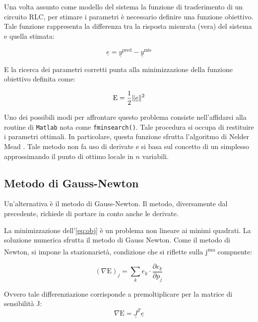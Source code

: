Una volta assunto come modello del sistema la funzione di trasferimento di un circuito RLC, per stimare i parametri è necessario definire una funzione obiettivo. Tale funzione rappresenta la differenza tra la risposta misurata (vera) del sistema e quella stimata:

\begin{equation}
\underline e=\underline y^{\operatorname{pred}} - \underline y^{\operatorname{mis}}
\end{equation}

E la ricerca dei parametri corretti punta alla minimizzazione della funzione obiettivo definita come:

\begin{equation}
 \mathrm{E}={1\over 2} \|\underline e\|^2
 \label{eq:obj}
\end{equation}

Uno dei possibili modi per affrontare questo problema consiste nell'affidarsi alla routine di \texttt{Matlab} nota come \texttt{fminsearch()}. Tale procedura si occupa di restituire i parametri ottimali. In particolare, questa funzione sfrutta l'algoritmo di Nelder Mead \cite{lagarias_convergence_1998}. Tale metodo non fa uso di derivate e si basa sul concetto di un simplesso approssimando il punto di ottimo locale in $n$ variabili. 


\subsection{Metodo di Gauss-Newton}

Un'alternativa è il metodo di Gauss-Newton. Il metodo, diversamente dal precedente, richiede di portare in conto anche le derivate. 

La minimizzazione dell'\cref{eq:obj} è un problema non lineare ai minimi quadrati. La soluzione numerica sfrutta il metodo di Gauss Newton. Come il metodo di Newton, si impone la stazionarietà, condizione che si riflette sulla j\textsuperscript{ma} compnente:

\begin{equation}
	(\nabla \mathrm {E})_{j}=\sum_{k} e_{k} \cdot \frac{\partial e_{k}}{\partial p_{j}}
\end{equation}

Ovvero tale differenziazione corrisponde a premoltiplicare per la matrice di sensibilità J:
\begin{equation}
\nabla \mathrm{E}=\underline{\underline{J}}^{T} \underline{e}
\end{equation}

